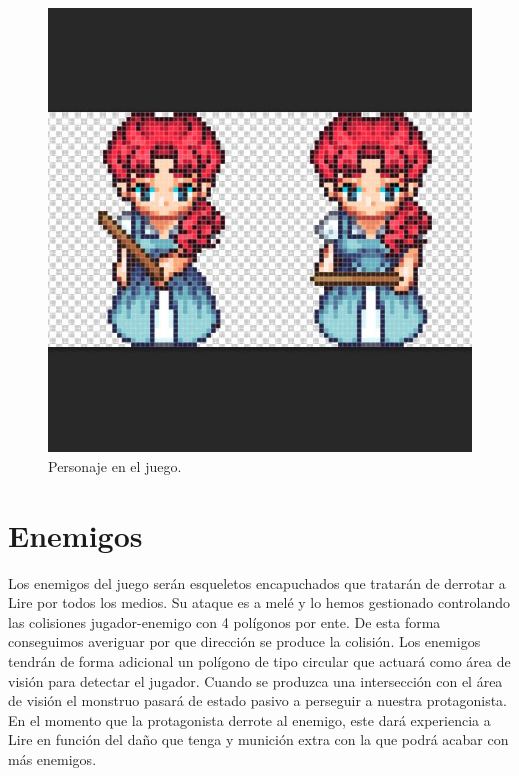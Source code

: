 \newpage
\begin{figure}[!htb]
  \centering
    \includegraphics[width=0.7\linewidth]{./img/pers0.JPG}
    \caption{Personaje en el juego.}
  \label{fig:yo}
\end{figure}
\section{Enemigos}
Los enemigos del juego serán esqueletos encapuchados que tratarán de derrotar a Lire por todos los medios. Su ataque es a melé y lo hemos gestionado controlando las colisiones jugador-enemigo con 4 polígonos por ente. De esta forma conseguimos averiguar por que dirección se produce la colisión. Los enemigos tendrán de forma adicional un polígono de tipo circular que actuará como área de visión para detectar el jugador. Cuando se produzca una intersección con el área de visión el monstruo pasará de estado pasivo a perseguir a nuestra protagonista. En el momento que la protagonista derrote al enemigo, este dará experiencia a Lire en función del daño que tenga y munición extra con la que podrá acabar con más enemigos.


